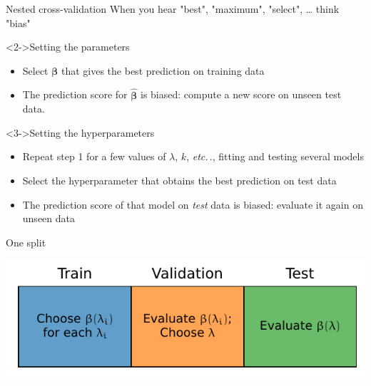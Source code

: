 \documentclass[presentation,mathserif,table]{beamer}
\newcommand{\etc}{\emph{etc.}\,}
\newcommand{\bbeta}{{\mathbold \beta}}
\begin{document}
\begin{frame}[label={sec:org98b5280}]{Nested cross-validation}
When you hear "best", "maximum", "select", \ldots{} think "bias"
\begin{block}<2->{Setting the parameters}
\begin{itemize}
\item \alert{Select} \(\bbeta\) that gives the \alert{best} prediction on training data
\item The prediction score for \(\hat{\bbeta}\) is biased: compute a new score on unseen test data.
\end{itemize}
\end{block}
\begin{block}<3->{Setting the hyperparameters}
\begin{itemize}
\item Repeat step 1 for a few values of \(\lambda\), \(k\), \etc., fitting and testing several models
\item \alert{Select} the hyperparameter that obtains the \alert{best} prediction on test data
\item The prediction score of that model on \emph{test} data is biased: evaluate it again on unseen data
\end{itemize}
\end{block}
\end{frame}
\begin{frame}[label={sec:org0b8118f}]{One split}
\begin{center}
\includegraphics[width=.9\linewidth]{figures/generated/train_eval_test/datasets.pdf}
\end{center}
\end{frame}
\end{document}
